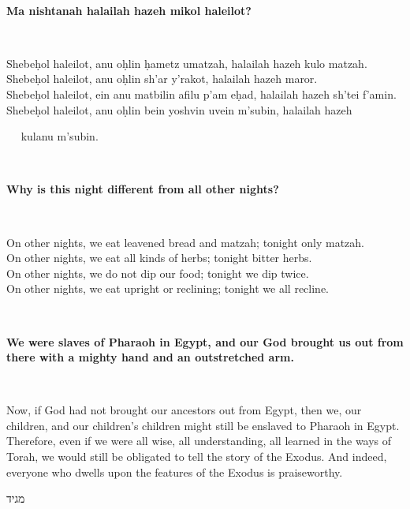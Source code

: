 \documentclass[a4paper,12pt,openany]{memoir}
\newcommand{\HgInst}[1]{{\noindent\sffamily{\bfseries{#1}}}}
\newcommand{\hchapter}[1]{
  \begin{hebrew}
    \begin{Spacing}{.97}
      \newpage
      \strut

      \vspace{.15em}

      \noindent\Huge #1

      \vspace{1em}
    \end{Spacing}
  \end{hebrew}
}
\newcommand{\HgHL}[1]{{\Large\textbf{#1}\par\noindent\\[-.5em]}}
\newenvironment{HgEnglish}{\strut\\\noindent}{\vspace{1em}}
\newenvironment{HgTranslit}{\strut\\\noindent\begin{itshape}}{\end{itshape}\vspace{1em}}
\begin{document}
\begin{HgTranslit}
  \HgHL{Ma nishtanah halailah hazeh mikol haleilot?}
  Shebe\d{h}ol haleilot, anu o\d{h}lin \d{h}ametz umatzah, 
  halailah hazeh kulo matzah. \\
  Shebe\d{h}ol haleilot, anu o\d{h}lin sh'ar y'rakot, 
  halailah hazeh maror. \\
  Shebe\d{h}ol haleilot, ein anu matbilin afilu p'am e\d{h}ad,
  halailah hazeh sh'tei f'amin. \\
  Shebe\d{h}ol haleilot, anu o\d{h}lin bein yoshvin uvein m'subin,
  halailah hazeh \\ \strut $\quad$ kulanu m'subin.
\end{HgTranslit}

\begin{HgEnglish}
  \HgHL{Why is this night different from all other nights?}
  On other nights, we eat leavened bread and matzah; tonight only matzah. \\
  On other nights, we eat all kinds of herbs; tonight bitter herbs. \\
  On other nights, we do not dip our food; tonight we dip twice. \\
  On other nights, we eat upright or reclining; tonight we all recline. \\
\end{HgEnglish}

\HgInst{Uncover the matzah, and read:}

\begin{HgEnglish}
\HgHL{We were slaves of Pharaoh in Egypt, and our God brought us out from there
with a mighty hand and an outstretched arm.}
Now, if God had not brought our ancestors out from Egypt, then we, our
children, and our children's children might still be enslaved to Pharaoh in
Egypt.  Therefore, even if we were all wise, all understanding, all learned in
the ways of Torah, we would still be obligated to tell the story of the Exodus.
And indeed, everyone who dwells upon the features of the Exodus is
praiseworthy.
\end{HgEnglish}

\vfill

\hchapter{מגיד}

\vfill
\end{document}
